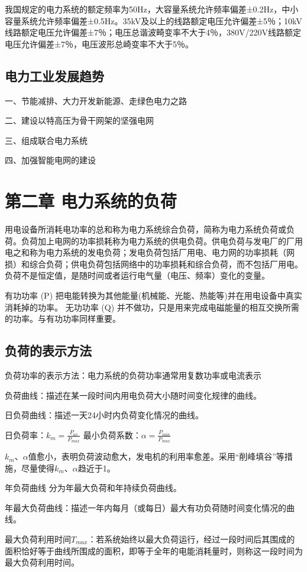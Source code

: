 \documentclass[UTF8, 12pt, a4paper]{ctexart}
\begin{document}
我国规定的电力系统的额定频率为50Hz，大容量系统允许频率偏差±0.2Hz，中小容量系统允许频率偏差±0.5Hz。35kV及以上的线路额定电压允许偏差±5％；10kV线路额定电压允许偏差±7％；电压总谐波畸变率不大于4％，380V/220V线路额定电压允许偏差±7％，电压波形总崎变率不大于5％。
\subsection{电力工业发展趋势}
一、节能减排、大力开发新能源、走绿色电力之路

二、建设以特高压为骨干网架的坚强电网

三、组成联合电力系统

四、加强智能电网的建设
\newpage{}
\section{第二章{} 电力系统的负荷}
用电设备所消耗电功率的总和称为电力系统综合负荷，简称为电力系统负荷或负荷。负荷加上电网的功率损耗称为电力系统的供电负荷。供电负荷与发电厂的厂用电之和称为电力系统的发电负荷；发电负荷包括厂用电、电力网的功率损耗（网损）和综合负荷；供电负荷包括网络中的功率损耗和综合负荷，而不包括厂用电。负荷不是恒定值，是随时间或者运行电气量（电压、频率）变化的变量。

有功功率 (P)
把电能转换为其他能量(机械能、光能、热能等)并在用电设备中真实消耗掉的功率。
无功功率 (Q) 并不做功，只是用来完成电磁能量的相互交换所需的功率。与有功功率同样重要。
\subsection{负荷的表示方法}
负荷功率的表示方法：电力系统的负荷功率通常用复数功率或电流表示

负荷曲线：描述在某一段时间内用电负荷大小随时间变化规律的曲线。

日负荷曲线：描述一天24小时内负荷变化情况的曲线。

日负荷率：$k_m=\frac{P_{av}}{P_{max}}$ \qquad 最小负荷系数：$\alpha=\frac{P_{min}}{P_{max}}$

$k_m$、$\alpha$值愈小，表明负荷波动愈大，发电机的利用率愈差。采用“削峰填谷”等措施，尽量使得$k_m$、$\alpha$趋近于1。

年负荷曲线 分为年最大负荷和年持续负荷曲线。

年最大负荷曲线：描述一年内每月（或每日）最大有功负荷随时间变化情况的曲线。

最大负荷利用时间$T_{max}$：若系统始终以最大负荷运行，经过一段时间后其围成的面积恰好等于曲线所围成的面积，即等于全年的电能消耗量时，则称这一段时间为最大负荷利用时间。
\end{document}
